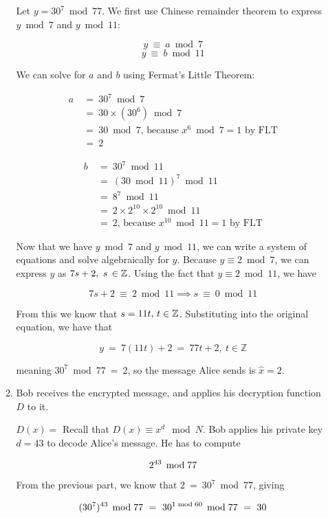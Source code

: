 \documentclass[11pt, preview]{standalone} %
\begin{document}
\begin{enumerate}
\begin{enumerate}
\begin{Freeform}{2}
Let $y = 30^7 \bmod 77$. We first use Chinese remainder theorem to express $y \bmod 7$ and $y \bmod 11$:

$$y\ \equiv\ a \bmod 7$$
$$y\ \equiv\ b \bmod 11$$

We can solve for $a$ and $b$ using Fermat's Little Theorem:

\begin{align*}
a\ &=\ 30^7 \bmod 7\\
&=\ 30 \times (30^6) \bmod 7\\
&=\ 30 \bmod 7 \text{, because $x^6 \bmod 7 = 1$ by FLT}\\ 
&=\ 2
\end{align*}

\begin{align*}
b\ &=\ 30^7 \bmod 11\\
&=\ (30 \bmod 11)^7 \bmod 11\\
&=\ 8^7 \bmod 11\\
&=\ 2 \times 2^{10} \times 2^{10} \bmod 11\\
&=\ 2 \text{, because $x^{10} \bmod 11 = 1$ by FLT}
\end{align*}

Now that we have $y \bmod 7$ and $y \bmod 11$, we can write a system of equations and solve algebraically for $y$. Because $y \equiv 2 \bmod 7$, we can express $y$ as $7s + 2,\ s\thinspace \in \mathbb{Z}$. Using the fact that $y \equiv 2 \bmod 11$, we have 

$$7s + 2\ \equiv\ 2 \bmod 11 \implies s\ \equiv\ 0 \bmod 11$$

From this we know that $s = 11t,\thinspace t\in \mathbb{Z}$. Substituting into the original equation, we have that

$$y\ =\ 7(11t) + 2\ =\ 77t + 2,\ t \in \mathbb{Z}$$

meaning $30^7 \bmod 77\ =\ 2$, so the message Alice sends is $\hat{x} = 2$.

\end{Freeform}
\item Bob receives the encrypted message, and applies his decryption function $D$ to it.
\begin{Freeform}{30}
$D(x) = $
\Hint Recall that $D(x) \equiv x^d \mod N$.
\Solution Bob applies his private key $d = 43$ to decode Alice's message. He has to compute 

$$2^{43}\thinspace \bmod 77$$

From the previous part, we know that $2\ =\ 30^7 \bmod 77$, giving 

$$(30^7)^{43}\thinspace \bmod 77\ =\ 30^{1 \bmod 60}\thinspace \bmod 77\ =\ 30$$


\end{Freeform}
\end{enumerate}
\end{enumerate}
\end{document}

